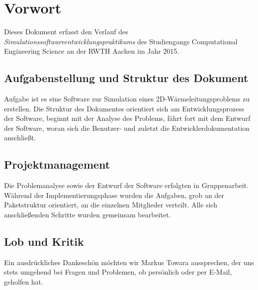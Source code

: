 \chapter{Vorwort}

Dieses Dokument erfasst den Verlauf des \emph{Simulationssoftwareentwicklungspraktikums} des Studiengangs Computational Engineering Science an der RWTH Aachen im Jahr 2015.

\section{Aufgabenstellung und Struktur des Dokument}

Aufgabe ist es eine Software zur Simulation eines 2D-Wärmeleitungsproblems zu erstellen. Die Struktur des Dokumentes orientiert sich am Entwicklungsprozess der Software, beginnt mit der Analyse des Problems, fährt fort mit dem Entwurf der Software, woran sich die Benutzer- und zuletzt die Entwicklerdokumentation anschließt.

\section{Projektmanagement}

Die Problemanalyse sowie der Entwurf der Software erfolgten in Gruppenarbeit. Während der Implementierungsphase wurden die Aufgaben, grob an der Paketstruktur orientiert, an die einzelnen Mitglieder verteilt. Alle sich anschließenden Schritte wurden gemeinsam bearbeitet.

\section{Lob und Kritik}

Ein ausdrückliches Dankeschön möchten wir Markus Towara aussprechen, der uns stets umgehend bei Fragen und Problemen, ob persönlich oder per E-Mail, geholfen hat.